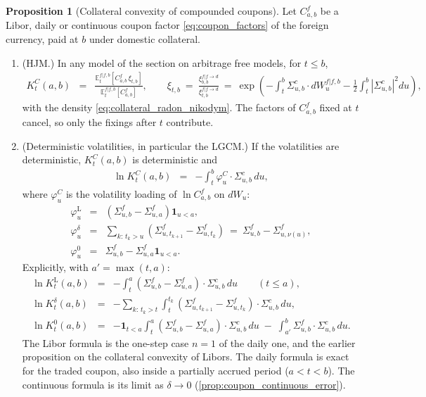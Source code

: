 \documentclass[11pt,english]{amsart}
\newcommand{\vun}{\mathbf{1}}
\newcommand{\EE}{\mathbb{E}}
\theoremstyle{definition}
\newtheorem{prop}{Proposition}
\begin{document}
\begin{prop}[Collateral convexity of compounded coupons]\label{prop:coupon_collateral_convexity}
Let $C^f_{a,b}$ be a Libor, daily or continuous coupon factor \eqref{eq:coupon_factors} of the foreign currency, paid at $b$ under domestic collateral.
\begin{enumerate}
\item (HJM.) In any model of the section on arbitrage free models, for $t\le b$,
\begin{eqnarray}
  K^C_t(a,b) &=& \frac{\EE^{f|f,b}_t\left[C^f_{a,b}\,\xi_{t,b}\right]}{\EE^{f|f,b}_t\left[C^f_{a,b}\right]} , \qquad
  \xi_{t,b} ~=~ \frac{\xi^{f|f\to d}_{b,b}}{\xi^{f|f\to d}_{t,b}} ~=~ \exp\left( -\int_t^b \Sigma^c_{u,b}\cdot dW^{f|f,b}_u - \frac{1}{2}\int_t^b \left|\Sigma^c_{u,b}\right|^2 du \right) ,
  \label{eq:coupon_convexity_hjm}
\end{eqnarray}
with the density \eqref{eq:collateral_radon_nikodym}. The factors of $C^f_{a,b}$ fixed at $t$ cancel, so only the fixings after $t$ contribute.
\item (Deterministic volatilities, in particular the LGCM.) If the volatilities are deterministic, $K^C_t(a,b)$ is deterministic and
\begin{eqnarray}
  \ln K^C_t(a,b) &=& -\int_t^b \varphi^C_u\cdot\Sigma^c_{u,b}\,du ,
  \label{eq:coupon_convexity_kernel}
\end{eqnarray}
where $\varphi^C_u$ is the volatility loading of $\ln C^f_{a,b}$ on $dW_u$:
\begin{eqnarray*}
  \varphi^{\mathrm{L}}_u &=& \left(\Sigma^f_{u,b} - \Sigma^f_{u,a}\right)\vun_{u<a} , \\
  \varphi^{\delta}_u &=& \sum_{k:\,t_k>u}\left(\Sigma^f_{u,t_{k+1}} - \Sigma^f_{u,t_k}\right) ~=~ \Sigma^f_{u,b} - \Sigma^f_{u,\nu(u)} , \\
  \varphi^{0}_u &=& \Sigma^f_{u,b} - \Sigma^f_{u,a}\vun_{u<a} .
\end{eqnarray*}
Explicitly, with $a' = \max(t,a)$:
\begin{eqnarray}
  \ln K^{\mathrm{L}}_t(a,b) &=& -\int_t^a \left(\Sigma^f_{u,b}-\Sigma^f_{u,a}\right)\cdot\Sigma^c_{u,b}\,du \qquad (t\le a) , \label{eq:coupon_convexity_libor}\\
  \ln K^{\delta}_t(a,b) &=& -\sum_{k:\,t_k>t}\int_t^{t_k}\left(\Sigma^f_{u,t_{k+1}}-\Sigma^f_{u,t_k}\right)\cdot\Sigma^c_{u,b}\,du , \label{eq:coupon_convexity_daily}\\
  \ln K^{0}_t(a,b) &=& -\vun_{t<a}\int_t^a \left(\Sigma^f_{u,b}-\Sigma^f_{u,a}\right)\cdot\Sigma^c_{u,b}\,du \;-\; \int_{a'}^b \Sigma^f_{u,b}\cdot\Sigma^c_{u,b}\,du . \label{eq:coupon_convexity_continuous}
\end{eqnarray}
The Libor formula is the one-step case $n=1$ of the daily one, and the earlier proposition on the collateral convexity of Libors. The daily formula is exact for the traded coupon, also inside a partially accrued period ($a<t<b$). The continuous formula is its limit as $\delta\to0$ (\autoref{prop:coupon_continuous_error}).
\end{enumerate}
\end{prop}
\end{document}
